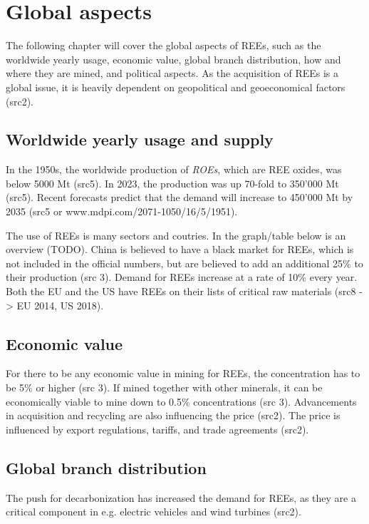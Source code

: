 
\section{Global aspects}

The following chapter will cover the global aspects of REEs, such as the worldwide yearly usage, economic value, global branch distribution, how and where they are mined, and political aspects. As the acquisition of REEs is a global issue, it is heavily dependent on geopolitical and geoeconomical factors (src2).

\subsection{Worldwide yearly usage and supply}

In the 1950s, the worldwide production of \textit{ROEs}, which are REE oxides, was below 5000 Mt (src5). In 2023, the production was up 70-fold to 350'000 Mt (src5). Recent forecasts predict that the demand will increase to 450'000 Mt by 2035 (src5 or www.mdpi.com/2071-1050/16/5/1951).

The use of REEs is many sectors and coutries. In the graph/table below is an overview (TODO). China is believed to have a black market for REEs, which is not included in the official numbers, but are believed to add an additional 25\% to their production (src 3). Demand for REEs increase at a rate of 10\% every year. Both the EU and the US have REEs on their lists of critical raw materials (src8 -> EU 2014, US 2018).

\subsection{Economic value}

For there to be any economic value in mining for REEs, the concentration has to be 5\% or higher (src 3). If mined together with other minerals, it can be economically viable to mine down to 0.5\% concentrations (src 3). Advancements in acquisition and recycling are also influencing the price (src2). The price is influenced by export regulations, tariffs, and trade agreements (src2).

\subsection{Global branch distribution}

The push for decarbonization has increased the demand for REEs, as they are a critical component in e.g. electric vehicles and wind turbines (src2).


